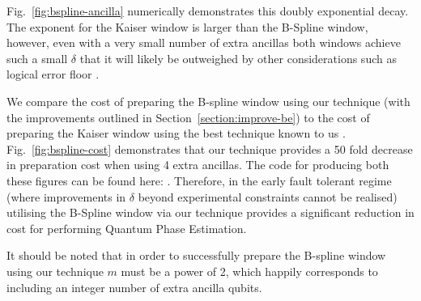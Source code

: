 Fig.~\ref{fig:bspline-ancilla} numerically demonstrates this doubly exponential decay. The exponent for the Kaiser window is larger than the B-Spline window, however, even with a very small number of extra ancillas both windows achieve such a small $\delta$ that it will likely be outweighed by other considerations such as logical error floor \cite{Acharya:2024btg}.

We compare the cost of preparing the B-spline window using our technique (with the improvements outlined in Section~\ref{section:improve-be}) to the cost of preparing the Kaiser window using the best technique known to us \cite{mcardleQuantumStatePreparation2022, Greenaway:2024jzs}. Fig.~\ref{fig:bspline-cost} demonstrates that our technique provides a 50 fold decrease in preparation cost when using 4 extra ancillas. The code for producing both these figures can be found here: \cite{o_brien_2025_14794186}. Therefore, in the early fault tolerant regime (where improvements in $\delta$ beyond experimental constraints cannot be realised) utilising the B-Spline window via our technique provides a significant reduction in cost for performing Quantum Phase Estimation.

It should be noted that in order to successfully prepare the B-spline window using our technique $m$ must be a power of 2, which happily corresponds to including an integer number of extra ancilla qubits.

